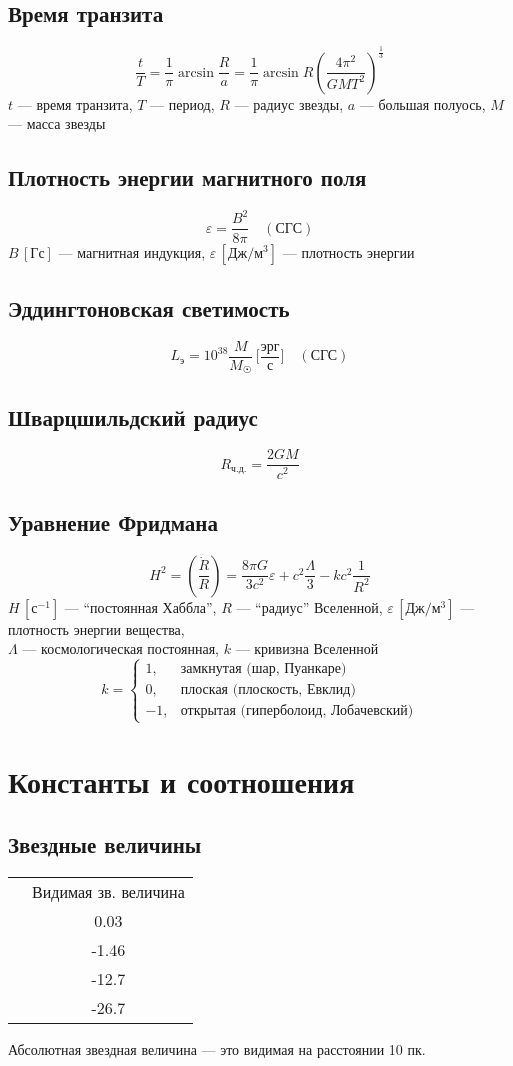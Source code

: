 \documentclass[12pt]{article}
\begin{document}
\subsection{Время транзита}
\[\frac{t}{T}=\frac{1}{\pi}\arcsin\frac Ra=\frac1\pi\arcsin R\left(\frac{4\pi^2}{GMT^2}\right)^{\frac13}\]
$t$ --- время транзита, $T$ --- период, $R$ --- радиус звезды, $a$ --- большая полуось, $M$ --- масса звезды
\subsection{Плотность энергии магнитного поля}
\[\varepsilon=\frac{B^2}{8\pi}\quad(\text{СГС})\]
$B\,[\text{Гс}]$ --- магнитная индукция, $\varepsilon\,[\text{Дж}/\text{м}^3]$ --- плотность энергии
\subsection{Эддингтоновская светимость}
\[L_\text{э}=10^{38}\frac{M}{M_{\astrosun}}\,\biggl[\frac{\text{эрг}}{\text{с}}\biggr]\quad(\text{СГС})\]
\subsection{Шварцшильдский радиус}
\[R_\text{ч.д.}=\frac{2GM}{c^2}\]
\subsection{Уравнение Фридмана}
\[H^2=\left(\frac{\dot{R}}{R}\right)=\frac{8\pi G}{3c^2}\varepsilon+c^2\frac{\Lambda}{3}-kc^2\frac{1}{R^2}\]
$H\,[\text{с}^{-1}]$ --- ``постоянная Хаббла'', $R$ --- ``радиус'' Вселенной, $\varepsilon\,[\text{Дж}/\text{м}^3]$ --- плотность энергии вещества,\\
$\Lambda$ --- космологическая постоянная, $k$ --- кривизна Вселенной
\[k=\begin{cases}
1, & \text{замкнутая (шар, Пуанкаре)}\\
0, & \text{плоская (плоскость, Евклид)}\\
-1, & \text{открытая (гиперболоид, Лобачевский)}
\end{cases}\]
\section{Константы и соотношения}
\subsection{Звездные величины}
\begin{center}\begin{tabular}{|c|c|}
 & Видимая зв. величина\\
 & 0.03\\
 & -1.46\\
 & -12.7\\
 & -26.7\\
\hline
\end{tabular}\end{center}
Абсолютная звездная величина --- это видимая на расстоянии 10 пк.
\end{document}
